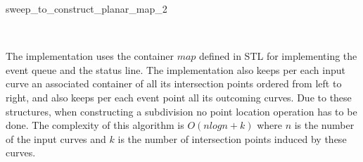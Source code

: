\begin{ccRefFunction}[CGAL::]{sweep_to_construct_planar_map_2}
\ccSeeAlso

 \\

\ccImplementation 
The implementation uses the container $map$ defined in STL for
implementing the event queue and the status line.  The implementation
also keeps per each input curve an associated container of all its
intersection points ordered from left to right, and also keeps per
each event point all its outcoming curves.  Due to these structures,
when constructing a subdivision no point location operation has to be
done. The complexity of this algorithm is $O(nlogn + k)$ where $n$ is
the number of the input curves and $k$ is the number of intersection
points induced by these curves.

\end{ccRefFunction}


